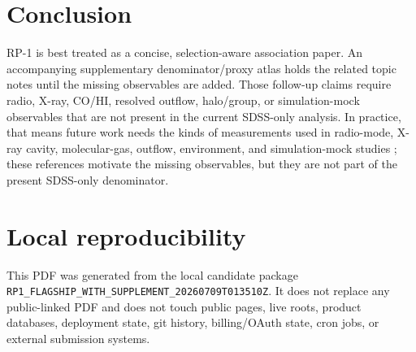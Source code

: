 \documentclass[twocolumn]{aastex631}
\begin{document}
\section{Conclusion}
RP-1 is best treated as a concise, selection-aware association paper. An accompanying supplementary denominator/proxy atlas holds the related topic notes until the missing observables are added. Those follow-up claims require radio, X-ray, CO/HI, resolved outflow, halo/group, or simulation-mock observables that are not present in the current SDSS-only analysis.
In practice, that means future work needs the kinds of measurements used in radio-mode, X-ray cavity, molecular-gas, outflow, environment, and simulation-mock studies \citep{best2005,dekel2006,fabian2012,heckmanbest2014,lamassa2013,mcnamara2007,veilleux2005,xcoldgass2017,xgass2018,cicone2014,carniani2017,fiore2017,simba2019,tng2019,eagle2015,peng2010,piotrowska2022,wetzel2013}; these references motivate the missing observables, but they are not part of the present SDSS-only denominator.

\section{Local reproducibility}
This PDF was generated from the local candidate package \texttt{RP1\_FLAGSHIP\_WITH\_SUPPLEMENT\_20260709T013510Z}. It does not replace any public-linked PDF and does not touch public pages, live roots, product databases, deployment state, git history, billing/OAuth state, cron jobs, or external submission systems.
\end{document}
